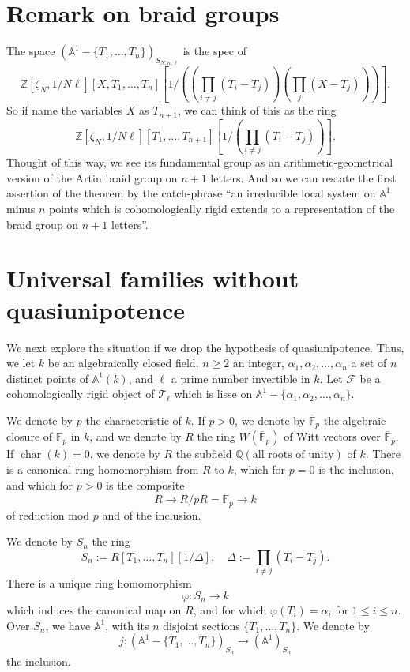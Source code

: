 \section{Remark on braid groups}\label{sec:5.6}

The space \((\mathbb{A}^1-\{T_1,\ldots,T_n\})_{S_{N,n,\ell}}\) is the spec of
\[
  \mathbb{Z}[\zeta_N,1/N\ell][X,T_1,\ldots,T_n]
  [1/((\prod_{i\neq j}(T_i-T_j))(\prod_j(X-T_j)))].
\]
So if name the variables \(X\) as \(T_{n+1}\), we can think of this as the ring
\[
  \mathbb{Z}[\zeta_N,1/N\ell][T_1,\ldots,T_{n+1}]
  [1/(\prod_{i\neq j}(T_i-T_j))].
\]
Thought of this way, we see its fundamental group as an arithmetic-geometrical
version of the Artin braid group on \(n+1\) letters. And so we can restate the
first assertion of the theorem by the catch-phrase ``an irreducible local
system on \(\mathbb{A}^1\) minus \(n\) points which is cohomologically rigid
extends to a representation of the braid group on \(n+1\) letters''.

\section{Universal families without quasiunipotence}\label{sec:5.7}

We next explore the situation if we drop the hypothesis of quasiunipotence.
Thus, we let \(k\) be an algebraically closed field, \(n\geq 2\) an integer,
\(\alpha_1,\alpha_2,\ldots,\alpha_n\) a set of \(n\) distinct points of
\(\mathbb{A}^1(k)\), and \(\ell\) a prime number invertible in \(k\). Let
\(\mathcal{F}\) be a cohomologically rigid object of \(\mathcal{T}_\ell\) which
is lisse on \(\mathbb{A}^1-\{\alpha_1,\alpha_2,\ldots,\alpha_n\}\).

We denote by \(p\) the characteristic of \(k\). If \(p>0\), we denote by
\(\overline{\mathbb{F}}_p\) the algebraic closure of \(\mathbb{F}_p\) in \(k\),
and we denote by \(R\) the ring \(W(\overline{\mathbb{F}}_p)\) of Witt vectors
over \(\overline{\mathbb{F}}_p\). If \(\operatorname{char}(k)=0\), we denote
by \(R\) the subfield \(\mathbb{Q}(\text{all roots of unity})\) of \(k\). There
is a canonical ring homomorphism from \(R\) to \(k\), which for \(p=0\) is the
inclusion, and which for \(p>0\) is the composite
\[
  R\to R/pR=\overline{\mathbb{F}}_p\to k
\]
of reduction mod \(p\) and of the inclusion.

We denote by \(S_n\) the ring
\[
  S_n:=R[T_1,\ldots,T_n][1/\Delta],
  \quad
  \Delta:=\prod_{i\neq j}(T_i-T_j).
\]
There is a unique ring homomorphism
\[
  \varphi:S_n\to k
\]
which induces the canonical map on \(R\), and for which
\(\varphi(T_i)=\alpha_i\) for \(1\leq i\leq n\). Over \(S_n\), we have
\(\mathbb{A}^1\), with its \(n\) disjoint sections
\(\{T_1,\ldots,T_n\}\). We denote by
\[
  j:(\mathbb{A}^1-\{T_1,\ldots,T_n\})_{S_n}\to(\mathbb{A}^1)_{S_n}
\]
the inclusion.


